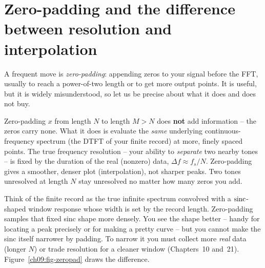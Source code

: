\section{Zero-padding and the difference between resolution and interpolation}
\label{ch09:zeropad}

A frequent move is \emph{zero-padding}: appending zeros to your signal before the FFT,
usually to reach a power-of-two length or to get more output points. It is useful, but it
is widely misunderstood, so let us be precise about what it does and does not buy.

\begin{whybox}
Zero-padding $x$ from length $N$ to length $M > N$ does \textbf{not} add information --
the zeros carry none. What it does is evaluate the \emph{same} underlying
continuous-frequency spectrum (the DTFT of your finite record) at more, finely spaced
points. The true frequency resolution -- your ability to \emph{separate} two nearby
tones -- is fixed by the duration of the real (nonzero) data, $\Delta f \approx f_s/N$.
Zero-padding gives a smoother, denser plot (interpolation), not sharper peaks. Two tones
unresolved at length $N$ stay unresolved no matter how many zeros you add.
\end{whybox}

\begin{intuitionbox}
Think of the finite record as the true infinite spectrum convolved with a
$\operatorname{sinc}$-shaped window response whose width is set by the record length. Zero-padding
samples that fixed sinc shape more densely. You see the shape better -- handy for
locating a peak precisely or for making a pretty curve -- but you cannot make the sinc
itself narrower by padding. To narrow it you must collect more \emph{real} data (longer
$N$) or trade resolution for a cleaner window (Chapters~10 and~21). Figure~\ref{ch09:fig-zeropad} draws the difference.
\end{intuitionbox}

